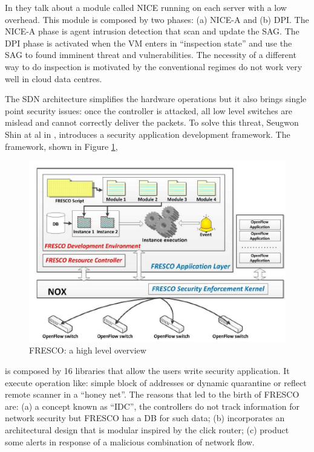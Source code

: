In \cite{sdn-and-openflow-from-concept-to-implementation:NICE} they talk about a module called \ac{NICE} running on each server with a low overhead. This module is composed by two phases: (a) \ac{NICE}-A and (b) \ac{DPI}. The \ac{NICE}-A phase is agent intrusion detection that scan and update the \ac{SAG}. The \ac{DPI} phase is activated when the \ac{VM} enters in ``inspection state'' and use the \ac{SAG} to found imminent threat and vulnerabilities. The necessity of a different way to do inspection is motivated by the conventional regimes do not work very well in cloud data centres.

The \ac{SDN} architecture simplifies the hardware operations but it also brings single point security issues: once the controller is attacked, all low level switches are mislead and cannot correctly deliver the packets. To solve this threat, Seugwon Shin at al in \cite{fresco-services}, introduces a security application development framework. The framework, shown in Figure \ref{fig:security-enhancement-using-SDN:FRESCO},

\begin{figure}
\centering
\includegraphics[scale=0.5]{Introduction/Image/FrescoStructure.png}
\caption{FRESCO: a high level overview}
\label{fig:security-enhancement-using-SDN:FRESCO}
\end{figure}

is composed by 16 libraries that allow the users write security application. It execute operation like: simple block of addresses or dynamic quarantine or reflect remote scanner in a ``honey net''. The reasons that led to the birth of FRESCO are: (a) a concept known as ``\ac{IDC}'', the controllers do not track information for network security but FRESCO has a \ac{DB} for such data; (b) incorporates an architectural design that is modular inspired by the click router; (c) product some alerts in response of a malicious combination of network flow.

